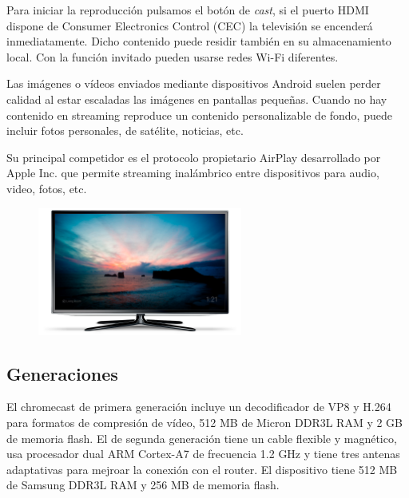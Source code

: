 Para iniciar la reproducción pulsamos el botón de \textit{cast}, si el puerto HDMI dispone de Consumer Electronics Control (CEC) la televisión se encenderá inmediatamente.
Dicho contenido puede residir también en su almacenamiento local. 
Con la función invitado pueden usarse redes Wi-Fi diferentes.

Las imágenes o vídeos enviados mediante dispositivos Android suelen perder calidad al estar escaladas las imágenes en pantallas pequeñas.
Cuando no hay contenido en streaming reproduce un contenido personalizable de fondo, puede incluir fotos personales, de satélite, noticias, etc.

Su principal competidor es el protocolo propietario AirPlay desarrollado por Apple Inc. que permite streaming inalámbrico entre dispositivos para audio, video, fotos, etc. 
\vspace{1cm}
\begin{figure}[h]
	\centering
	\includegraphics[width=0.6\textwidth]{./Imagenes/fondo.png}
	\label{fig:fondo}
\end{figure}

\newpage


\subsection{Generaciones}
El chromecast de primera generación incluye un decodificador de VP8 y H.264 para formatos de compresión de vídeo, 512 MB de Micron DDR3L RAM y 2 GB de memoria flash.
El de segunda generación tiene un cable flexible y magnético, usa procesador dual ARM Cortex-A7 de frecuencia 1.2 GHz y tiene tres antenas adaptativas para mejroar la conexión con el router.
El dispositivo tiene 512 MB de Samsung DDR3L RAM y 256 MB de memoria flash.